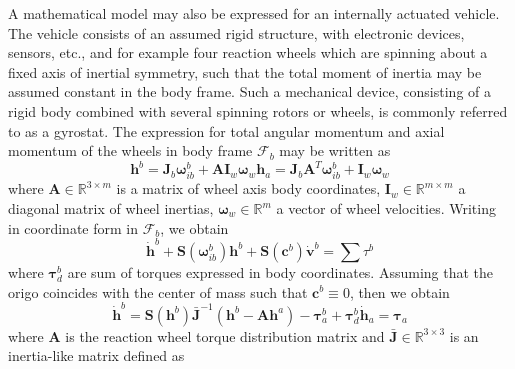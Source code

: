 A mathematical model may also be expressed for an internally actuated
vehicle. The vehicle consists of an assumed rigid structure, with electronic
devices, sensors, etc., and for example four reaction wheels which are spinning about a fixed axis of inertial symmetry, such that the total moment of inertia may be assumed constant in the
body frame. Such a mechanical device, consisting of a rigid body combined with several
spinning rotors or wheels, is commonly referred to as a gyrostat. The expression for total angular momentum and axial momentum of the wheels in body frame $\mathcal{F}_b$ may be written as
\begin{subequations}
\begin{equation}
    \mathbf{h}^b=\mathbf{J}_b\boldsymbol{\omega}^b_{ib}+\mathbf{A}\mathbf{I}_w\boldsymbol{\omega}_w
\end{equation}
\begin{equation}
    \mathbf{h}_a=\mathbf{J}_b\mathbf{A}^T\boldsymbol{\omega}^b_{ib}+\mathbf{I}_w\boldsymbol{\omega}_w
\end{equation}
\end{subequations}
where $\mathbf{A} \in \mathbb{R}^{3 \times m}$ is a matrix of wheel axis body coordinates, $\mathbf{I}_w \in \mathbb{R}^{m \times m}$ a diagonal matrix of wheel inertias, $\boldsymbol{\omega}_w \in \mathbb{R}^m$ a vector of wheel velocities.
Writing in coordinate form in $\mathcal{F}_b$, we obtain 
\begin{equation}
    \dot{\mathbf{h}}^b+\mathbf{S}\left ( \boldsymbol{\omega}^b_{ib}\right ) \mathbf{h}^b+\mathbf{S}\left (\mathbf{c}^b\right)\dot{\mathbf{v}}^b=\sum{\tau}^b 
\end{equation}
\noindent where $\boldsymbol{\tau}^b_d$ are sum of torques expressed in body coordinates. Assuming that the origo coincides with the center of mass such that $\mathbf{c}^b\equiv 0$, then we obtain
\begin{subequations}
    \begin{equation}
    \dot{\mathbf{h}}^b=\mathbf{S}\left ( \mathbf{h}^b \right ) \bar{\mathbf{J}}^{-1}\left(\mathbf{h}^b-\mathbf{A}\mathbf{h}^a \right)-\boldsymbol{\tau}^b_a+\boldsymbol{\tau}^b_d
    \end{equation}
    \begin{equation}
    \dot{\mathbf{h}}_a=\boldsymbol{\tau}_a
    \end{equation}
\end{subequations}
\noindent where $\mathbf{A}$ is the reaction wheel torque distribution matrix and $\bar{\mathbf{J}} \in \mathbb{R}^{3 \times 3}$ is an inertia-like matrix defined as
